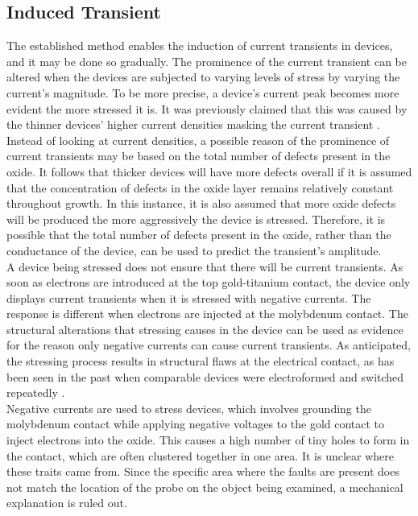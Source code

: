 \subsection[Induced Transient]{Induced Transient}

The established method enables the induction of current transients in devices, and it may be done so gradually. The prominence of the current transient can be altered when the devices are subjected to varying levels of stress by varying the current's magnitude. To be more precise, a device's current peak becomes more evident the more stressed it is. It was previously claimed that this was caused by the thinner devices' higher current densities masking the current transient \cite{el2007ionic}. \\

\noindent Instead of looking at current densities, a possible reason of the prominence of current transients may be based on the total number of defects present in the oxide. It follows that thicker devices will have more defects overall if it is assumed that the concentration of defects in the oxide layer remains relatively constant throughout growth. In this instance, it is also assumed that more oxide defects will be produced the more aggressively the device is stressed. Therefore, it is possible that the total number of defects present in the oxide, rather than the conductance of the device, can be used to predict the transient's amplitude. \\

\noindent A device being stressed does not ensure that there will be current transients. As soon as electrons are introduced at the top gold-titanium contact, the device only displays current transients when it is stressed with negative currents. The response is different when electrons are injected at the molybdenum contact. The structural alterations that stressing causes in the device can be used as evidence for the reason only negative currents can cause current transients. As anticipated, the stressing process results in structural flaws at the electrical contact, as has been seen in the past when comparable devices were electroformed and switched repeatedly \cite{waser1990dcI,waser1990dcII}. \\

\noindent Negative currents are used to stress devices, which involves grounding the molybdenum contact while applying negative voltages to the gold contact to inject electrons into the oxide. This causes a high number of tiny holes to form in the contact, which are often clustered together in one area. It is unclear where these traits came from. Since the specific area where the faults are present does not match the location of the probe on the object being examined, a mechanical explanation is ruled out. \\

